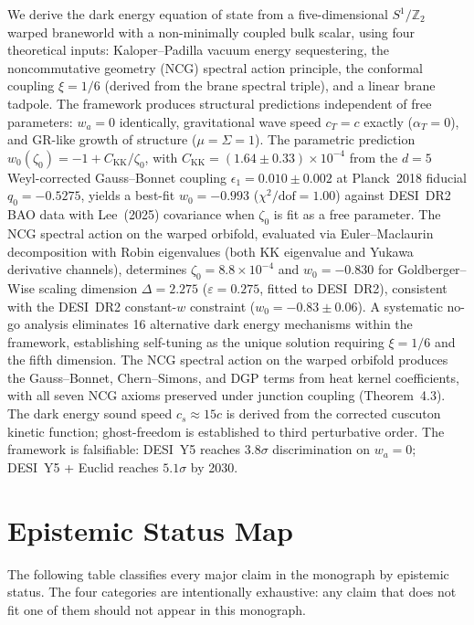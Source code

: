 \documentclass[10pt,a4paper,openany,twocolumn]{book}
\theoremstyle{definition}
\theoremstyle{remark}
\begin{document}
We derive the dark energy equation of state from a five-dimensional $S^1/\mathbb{Z}_2$ warped braneworld with a non-minimally coupled bulk scalar, using four theoretical inputs: Kaloper--Padilla vacuum energy sequestering, the noncommutative geometry (NCG) spectral action principle, the conformal coupling $\xi = 1/6$ (derived from the brane spectral triple), and a linear brane tadpole. The framework produces structural predictions independent of free parameters: $w_a = 0$ identically, gravitational wave speed $c_T = c$ exactly ($\alpha_T = 0$), and GR-like growth of structure ($\mu = \Sigma = 1$). The parametric prediction $w_0(\zeta_0) = -1 + C_{\mathrm{KK}}/\zeta_0$, with $C_{\mathrm{KK}} = (1.64 \pm 0.33) \times 10^{-4}$ from the $d = 5$ Weyl-corrected Gauss--Bonnet coupling $\epsilon_1 = 0.010 \pm 0.002$ at Planck~2018 fiducial $q_0 = -0.5275$, yields a best-fit $w_0 = -0.993$ ($\chi^2/\mathrm{dof} = 1.00$) against DESI~DR2 BAO data with Lee~(2025) covariance when $\zeta_0$ is fit as a free parameter. The NCG spectral action on the warped orbifold, evaluated via Euler--Maclaurin decomposition with Robin eigenvalues (both KK eigenvalue and Yukawa derivative channels), determines $\zeta_0 = 8.8 \times 10^{-4}$ and $w_0 = -0.830$ for Goldberger--Wise scaling dimension $\Delta = 2.275$ ($\varepsilon = 0.275$, fitted to DESI~DR2), consistent with the DESI~DR2 constant-$w$ constraint ($w_0 = -0.83 \pm 0.06$). A systematic no-go analysis eliminates 16 alternative dark energy mechanisms within the framework, establishing self-tuning as the unique solution requiring $\xi = 1/6$ and the fifth dimension. The NCG spectral action on the warped orbifold produces the Gauss--Bonnet, Chern--Simons, and DGP terms from heat kernel coefficients, with all seven NCG axioms preserved under junction coupling (Theorem~4.3). The dark energy sound speed $c_s \approx 15c$ is derived from the corrected cuscuton kinetic function; ghost-freedom is established to third perturbative order. The framework is falsifiable: DESI~Y5 reaches $3.8\sigma$ discrimination on $w_a = 0$; DESI~Y5 + Euclid reaches $5.1\sigma$ by 2030.

\chapter*{Epistemic Status Map}

\noindent
The following table classifies every major claim in the monograph by epistemic status. The four categories are intentionally exhaustive: any claim that does not fit one of them should not appear in this monograph.
\end{document}
